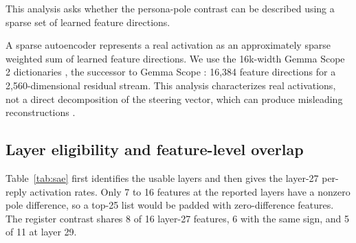 This analysis asks whether the persona-pole contrast can be described using a
sparse set of learned feature directions.

A sparse autoencoder \citep{bricken2023monosemanticity, templeton2024scaling}
represents a real activation as an approximately sparse
weighted sum of learned feature directions. We use the 16k-width Gemma Scope 2
dictionaries \citep{gemmascope2}, the successor to Gemma Scope
\citep{lieberum2024gemmascope}: 16,384 feature directions for a 2,560-dimensional
residual stream. This analysis characterizes real activations, not a direct
decomposition of the steering vector, which can produce misleading
reconstructions \citep{mayne2024decompose}.

\subsection{Layer eligibility and feature-level overlap}

Table~\ref{tab:sae} first identifies the usable layers and then gives the
layer-27 per-reply activation rates. Only 7 to 16 features at the reported
layers have a nonzero pole difference, so a top-25 list would be padded with
zero-difference features. The register contrast shares 8 of 16 layer-27
features, 6 with the same sign, and 5 of 11 at layer 29.

